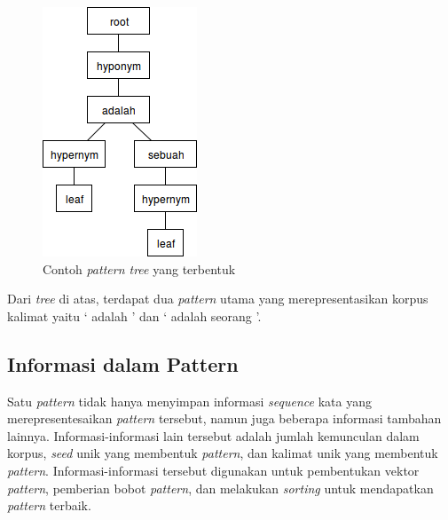 \begin{figure}
    \centering
    \includegraphics[scale=0.7]{pics/contoh-patterntree}
    \caption{Contoh \textit{pattern tree} yang terbentuk}
    \label{fig:contoh-ptree}
\end{figure}

\noindent Dari \textit{tree} di atas, terdapat dua \textit{pattern} utama yang merepresentasikan korpus kalimat yaitu `{\tagHyponym} adalah {\tagHypernym}' dan `{\tagHyponym} adalah seorang {\tagHypernym}'.

\subsection{Informasi dalam Pattern}
Satu \textit{pattern} tidak hanya menyimpan informasi \textit{sequence} kata yang merepresentesaikan \textit{pattern} tersebut, namun juga beberapa informasi tambahan lainnya. Informasi-informasi lain tersebut adalah jumlah kemunculan dalam korpus, \textit{seed} unik yang membentuk \textit{pattern}, dan kalimat unik yang membentuk \textit{pattern}. Informasi-informasi tersebut digunakan untuk pembentukan vektor \textit{pattern}, pemberian bobot \textit{pattern}, dan melakukan \textit{sorting} untuk mendapatkan \textit{pattern} terbaik.

